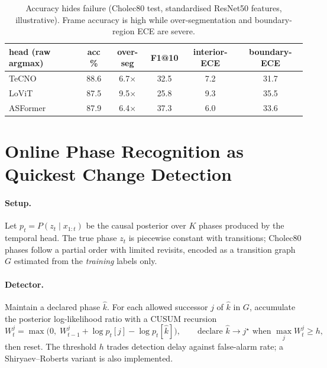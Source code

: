 \documentclass[11pt]{article}
\begin{document}
\begin{table}[t]\centering\small
\caption{Accuracy hides failure (Cholec80 test, standardised ResNet50 features,
illustrative). Frame accuracy is high while over-segmentation and boundary-region
ECE are severe.}
\label{tab:diag}
\begin{tabular}{lccccc}
\toprule
head (raw argmax) & acc \% & over-seg & F1@10 & interior-ECE & boundary-ECE \\
\midrule
TeCNO    & 88.6 & 6.7$\times$ & 32.5 & 7.2 & 31.7 \\
LoViT    & 87.5 & 9.5$\times$ & 25.8 & 9.3 & 35.5 \\
ASFormer & 87.9 & 6.4$\times$ & 37.3 & 6.0 & 33.6 \\
\bottomrule
\end{tabular}
\end{table}

\section{Online Phase Recognition as Quickest Change Detection}
\label{sec:qcd}
\paragraph{Setup.} Let $p_t=P(z_t\mid x_{1:t})$ be the causal posterior over $K$
phases produced by the temporal head. The true phase $z_t$ is piecewise constant
with transitions; Cholec80 phases follow a partial order with limited revisits,
encoded as a transition graph $G$ estimated from the \emph{training} labels only.

\paragraph{Detector.} Maintain a declared phase $\hat k$. For each allowed successor
$j$ of $\hat k$ in $G$, accumulate the posterior log-likelihood ratio with a CUSUM
recursion
\begin{equation}
W^{j}_t=\max\!\big(0,\; W^{j}_{t-1}+\log p_t[j]-\log p_t[\hat k]\big),\qquad
\text{declare } \hat k\!\to\! j^\star \text{ when } \max_j W^{j}_t \ge h ,
\end{equation}
then reset. The threshold $h$ trades detection delay against false-alarm rate; a
Shiryaev--Roberts variant is also implemented.
\end{document}
